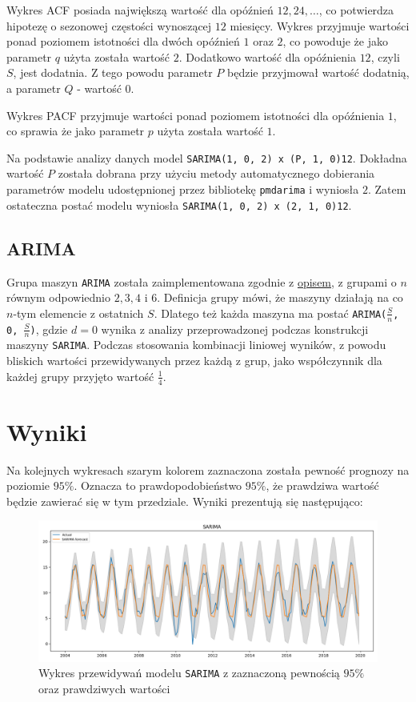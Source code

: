 \documentclass[12pt]{article}
\begin{document}
Wykres ACF posiada największą wartość dla opóźnień $12, 24, \dots$, co potwierdza hipotezę o sezonowej częstości wynoszącej $12$ miesięcy. Wykres przyjmuje wartości ponad poziomem istotności dla dwóch opóźnień $1$ oraz $2$, co powoduje że jako parametr $q$ użyta została wartość $2$. Dodatkowo wartość dla opóźnienia $12$, czyli $S$, jest dodatnia. Z tego powodu parametr $P$ będzie przyjmował wartość dodatnią, a parametr $Q$ - wartość $0$.

Wykres PACF przyjmuje wartości ponad poziomem istotności dla opóźnienia $1$, co sprawia że jako parametr $p$ użyta została wartość $1$.

Na podstawie analizy danych model \texttt{SARIMA(1, 0, 2) x (P, 1, 0)12}. Dokładna wartość $P$ została dobrana przy użyciu metody automatycznego dobierania parametrów modelu udostępnionej przez bibliotekę \texttt{pmdarima} i wyniosła $2$. Zatem ostateczna postać modelu wyniosła \texttt{SARIMA(1, 0, 2) x (2, 1, 0)12}.

\subsection{ARIMA}

Grupa maszyn \texttt{ARIMA} została zaimplementowana zgodnie z \hyperref[group-arima]{opisem}, z grupami o $n$ równym odpowiednio $2, 3, 4$ i $6$. Definicja grupy mówi, że maszyny działają na co $n$-tym elemencie z ostatnich $S$. Dlatego też każda maszyna ma postać \texttt{ARIMA($\frac{S}{n}$, 0, $\frac{S}{n}$)}, gdzie $d = 0$ wynika z analizy przeprowadzonej podczas konstrukcji maszyny \texttt{SARIMA}. Podczas stosowania kombinacji liniowej wyników, z powodu bliskich wartości przewidywanych przez każdą z grup, jako współczynnik dla każdej grupy przyjęto wartość $\frac{1}{4}$.

\section{Wyniki}

Na kolejnych wykresach szarym kolorem zaznaczona została pewność prognozy na poziomie $95\%$. Oznacza to prawdopodobieństwo $95\%$, że prawdziwa wartość będzie zawierać się w tym przedziale. Wyniki prezentują się następująco:

\begin{figure}[H]
    \includegraphics[width=\textwidth]{img/sarima.png}
    \caption{Wykres przewidywań modelu \texttt{SARIMA} z zaznaczoną pewnością $95\%$ oraz prawdziwych wartości}
\end{figure}
\end{document}
